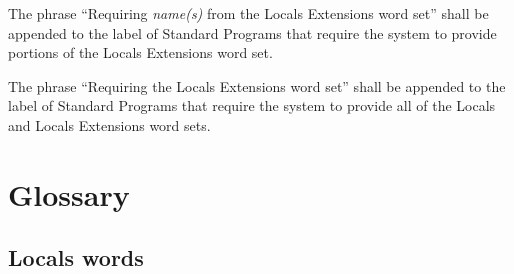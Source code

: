 The phrase ``Requiring \emph{name(s)} from the Locals Extensions
word set'' shall be appended to the label of Standard Programs that
require the system to provide portions of the Locals Extensions word
set.

The phrase ``Requiring the Locals Extensions word set'' shall be
appended to the label of Standard Programs that require the system
to provide all of the Locals and Locals Extensions word sets.


\section{Glossary} %

\subsection{Locals words} %

